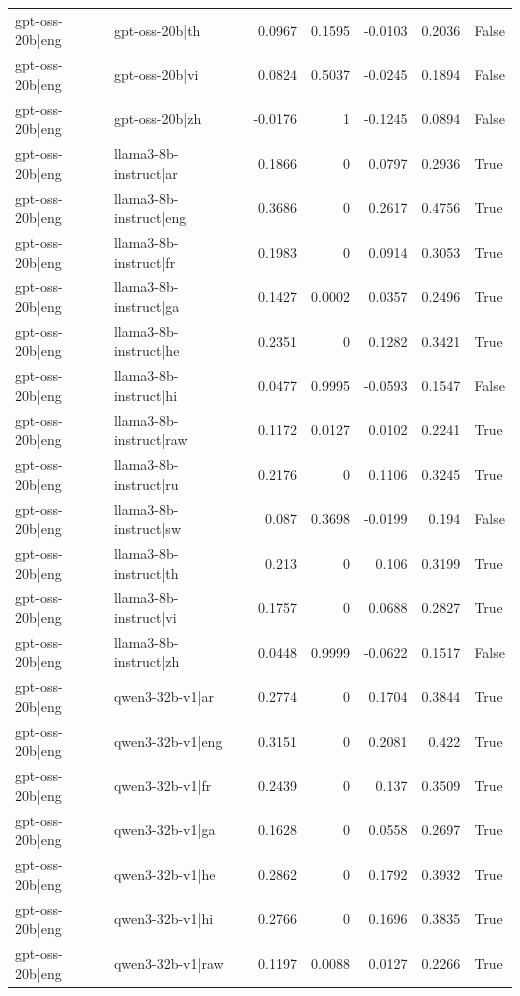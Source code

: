 \begin{table}
\begin{tabular}{l l r r r r l}
gpt-oss-20b|eng & gpt-oss-20b|th & 0.0967 & 0.1595 & -0.0103 & 0.2036 & False \\
gpt-oss-20b|eng & gpt-oss-20b|vi & 0.0824 & 0.5037 & -0.0245 & 0.1894 & False \\
gpt-oss-20b|eng & gpt-oss-20b|zh & -0.0176 & 1 & -0.1245 & 0.0894 & False \\
gpt-oss-20b|eng & llama3-8b-instruct|ar & 0.1866 & 0 & 0.0797 & 0.2936 & True \\
gpt-oss-20b|eng & llama3-8b-instruct|eng & 0.3686 & 0 & 0.2617 & 0.4756 & True \\
gpt-oss-20b|eng & llama3-8b-instruct|fr & 0.1983 & 0 & 0.0914 & 0.3053 & True \\
gpt-oss-20b|eng & llama3-8b-instruct|ga & 0.1427 & 0.0002 & 0.0357 & 0.2496 & True \\
gpt-oss-20b|eng & llama3-8b-instruct|he & 0.2351 & 0 & 0.1282 & 0.3421 & True \\
gpt-oss-20b|eng & llama3-8b-instruct|hi & 0.0477 & 0.9995 & -0.0593 & 0.1547 & False \\
gpt-oss-20b|eng & llama3-8b-instruct|raw & 0.1172 & 0.0127 & 0.0102 & 0.2241 & True \\
gpt-oss-20b|eng & llama3-8b-instruct|ru & 0.2176 & 0 & 0.1106 & 0.3245 & True \\
gpt-oss-20b|eng & llama3-8b-instruct|sw & 0.087 & 0.3698 & -0.0199 & 0.194 & False \\
gpt-oss-20b|eng & llama3-8b-instruct|th & 0.213 & 0 & 0.106 & 0.3199 & True \\
gpt-oss-20b|eng & llama3-8b-instruct|vi & 0.1757 & 0 & 0.0688 & 0.2827 & True \\
gpt-oss-20b|eng & llama3-8b-instruct|zh & 0.0448 & 0.9999 & -0.0622 & 0.1517 & False \\
gpt-oss-20b|eng & qwen3-32b-v1|ar & 0.2774 & 0 & 0.1704 & 0.3844 & True \\
gpt-oss-20b|eng & qwen3-32b-v1|eng & 0.3151 & 0 & 0.2081 & 0.422 & True \\
gpt-oss-20b|eng & qwen3-32b-v1|fr & 0.2439 & 0 & 0.137 & 0.3509 & True \\
gpt-oss-20b|eng & qwen3-32b-v1|ga & 0.1628 & 0 & 0.0558 & 0.2697 & True \\
gpt-oss-20b|eng & qwen3-32b-v1|he & 0.2862 & 0 & 0.1792 & 0.3932 & True \\
gpt-oss-20b|eng & qwen3-32b-v1|hi & 0.2766 & 0 & 0.1696 & 0.3835 & True \\
gpt-oss-20b|eng & qwen3-32b-v1|raw & 0.1197 & 0.0088 & 0.0127 & 0.2266 & True \\

\end{tabular}
\end{table}
